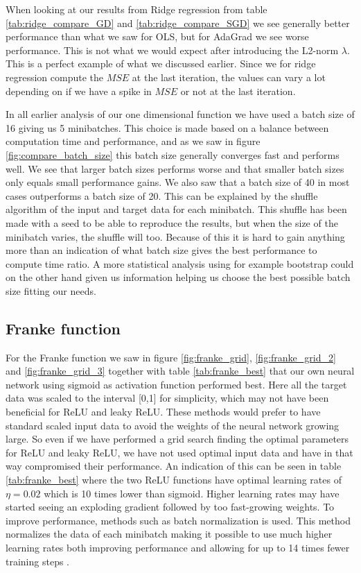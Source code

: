 \documentclass[11pt]{article}
\begin{document}
When looking at our results from Ridge regression from table \ref{tab:ridge_compare_GD} and \ref{tab:ridge_compare_SGD} we see generally better performance than what we saw for OLS, but for AdaGrad we see worse performance. This is not what we would expect after introducing the L2-norm $\lambda$. This is a perfect example of what we discussed earlier. Since we for ridge regression compute the $MSE$ at the last iteration, the values can vary a lot depending on if we have a spike in $MSE$ or not at the last iteration.


In all earlier analysis of our one dimensional function we have used a batch size of 16 giving us 5 minibatches. This choice is made based on a balance between computation time and performance, and as we saw in figure \ref{fig:compare_batch_size} this batch size generally converges fast and performs well. We see that larger batch sizes performs worse and that smaller batch sizes only equals small performance gains. We also saw that a batch size of 40 in most cases outperforms a batch size of 20. This can be explained by the shuffle algorithm of the input and target data for each minibatch. This shuffle has been made with a seed to be able to reproduce the results, but when the size of the minibatch varies, the shuffle will too. Because of this it is hard to gain anything more than an indication of what batch size gives the best performance to compute time ratio. A more statistical analysis using for example bootstrap could on the other hand given us information helping us choose the best possible batch size fitting our needs.

\subsection{Franke function}
For the Franke function we saw in figure \ref{fig:franke_grid}, \ref{fig:franke_grid_2} and \ref{fig:franke_grid_3} together with table \ref{tab:franke_best} that our own neural network using sigmoid as activation function performed best. Here all the target data was scaled to the interval [0,1] for simplicity, which may not have been beneficial for ReLU and leaky ReLU. These methods would prefer to have standard scaled input data \cite{deeplearning} to avoid the weights of the neural network growing large. So even if we have performed a grid search finding the optimal parameters for ReLU and leaky ReLU, we have not used optimal input data and have in that way compromised their performance. An indication of this can be seen in table \ref{tab:franke_best} where the two ReLU functions have optimal learning rates of $\eta=0.02$ which is 10 times lower than sigmoid. Higher learning rates may have started seeing an exploding gradient followed by too fast-growing weights. To improve performance, methods such as batch normalization is used. This method normalizes the data of each minibatch making it possible to use much higher learning rates both improving performance and allowing for up to 14 times fewer training steps \cite{batchnormalization}.
\end{document}
